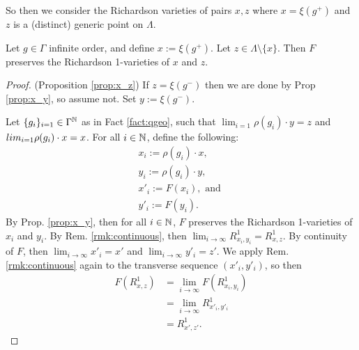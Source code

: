 So then we consider the Richardson varieties of pairs $x, z$ where 
$x = \xi(g^+)$ and $z$ is a (distinct) generic point on $\Lambda$.
\begin{proposition}\label{prop:x_z}
    Let $g \in \Gamma$ infinite order, and define $x := \xi(g^+)$. 
    Let $z \in \Lambda \setminus \{x\}$. 
    Then $F$ preserves the Richardson 1-varieties of $x$ and $z$.
\end{proposition}
\begin{proof}(Proposition \ref{prop:x_z})
    If $z = \xi(g^-)$ then we are done by Prop \ref{prop:x_y}, so assume not. 
    Set $y := \xi(g^-)$.

    Let $\{g_i\}_{i=1} \in \Gamma^{\mathbb{N}}$ as in Fact \ref{fact:qgeo}, 
    such that $\lim_{i=1}\rho(g_i)\cdot y = z$ and $\\lim_{i=1}\rho(g_i)\cdot x = x$. 
    For all $i\in \mathbb{N}$, define the following:
    \begin{align}
        x_i := \rho(g_i) \cdot x, \\
        y_i := \rho(g_i) \cdot y, \\
        x'_i := F(x_i), \text{ and } \\
        y'_i := F(y_i).
    \end{align}
    By Prop. \ref{prop:x_y}, then for all $i \in \mathbb{N}$, 
    $F$ preserves the Richardson 1-varieties of $x_i$ and $y_i$.
    By Rem. \ref{rmk:continuous}, then $\lim_{i\rightarrow \infty} R^1_{x_i,y_i} = R^1_{x,z}$.
    By continuity of $F$, then $\lim_{i\rightarrow \infty}x'_i = x'$ and $\lim_{i\rightarrow \infty}y'_i = z'$.
    We apply Rem. \ref{rmk:continuous} again to the transverse sequence $(x'_i, y'_i)$, 
    so then 
    \begin{align}
        F(R^1_{x,z}) 
        &= \lim_{i\rightarrow \infty} F(R^1_{x_i,y_i}) \\
        &= \lim_{i\rightarrow \infty} R^1_{x'_i,y'_i} \\
        &= R^1_{x',z'}.
    \end{align}
\end{proof}

